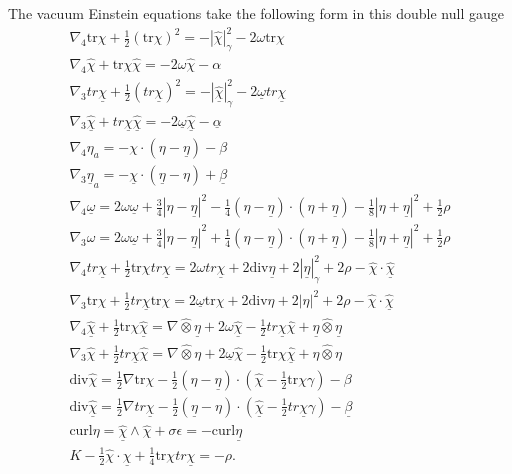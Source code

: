 \documentclass{amsart}
\newcommand{\tr}{\mbox{tr}}
\begin{document}
\noindent The vacuum Einstein equations take the following form in this double null gauge
\begin{gather}
\nabla_{4}\tr\chi+\frac{1}{2}(\tr\chi)^{2}=-|\hat{\chi}|^{2}_{\gamma}-2\omega \tr\chi\\
\nabla_{4}\hat{\chi}+\tr\chi \hat{\chi}=-2\omega\hat{\chi}-\alpha\\
\nabla_{3}tr\underline{\chi}+\frac{1}{2}(tr\underline{\chi})^{2}=-|\hat{\underline{\chi}}|^{2}_{\gamma}-2\underline{\omega}tr\underline{\chi}\\
\nabla_{3}\hat{\underline{\chi}}+tr\underline{\chi}\hat{\underline{\chi}}=-2\underline{\omega}\hat{\underline{\chi}}-\underline{\alpha}\\
\label{eq:eta}
\nabla_{4}\eta_{a}=-\chi\cdot(\eta-\underline{\eta})-\beta\\
\nabla_{3}\underline{\eta}_{a}=-\underline{\chi}\cdot(\underline{\eta}-\eta)+\underline{\beta} \\
\nabla_{4}\underline{\omega}=2\omega\underline{\omega}+\frac{3}{4}|\eta-\underline{\eta}|^{2}-\frac{1}{4}(\eta-\underline{\eta})\cdot(\eta+\underline{\eta})-\frac{1}{8}|\eta+\underline{\eta}|^{2}+\frac{1}{2}\rho \\
\nabla_{3}\omega=2\omega\underline{\omega}+\frac{3}{4}|\eta-\underline{\eta}|^{2}+\frac{1}{4}(\eta-\underline{\eta})\cdot(\eta+\underline{\eta})-\frac{1}{8}|\eta+\underline{\eta}|^{2}+\frac{1}{2}\rho \\
\nabla_{4}tr\underline{\chi}+\frac{1}{2}\tr\chi tr\underline{\chi}=2\omega tr\underline{\chi}+2\text{div}\underline{\eta}+2|\underline{\eta}|^{2}_{\gamma}+2\rho-\hat{\chi}\cdot\hat{\underline{\chi}}\\
\nabla_{3}\tr\chi+\frac{1}{2}tr\underline{\chi}\tr\chi=2\underline{\omega}\tr\chi+2\text{div}\eta+2|\eta|^{2}+2\rho-\hat{\chi}\cdot \hat{\underline{\chi}}\\
\nabla_{4}\hat{\underline{\chi}}+\frac{1}{2}\tr\chi\hat{\underline{\chi}}=\nabla\hat{\otimes}\underline{\eta}+2\omega\hat{\underline{\chi}}-\frac{1}{2}tr\underline{\chi}\hat{\chi}+\underline{\eta}\hat{\otimes}\underline{\eta}\\
\nabla_{3}\hat{\chi}+\frac{1}{2}tr\underline{\chi}\hat{\chi}=\nabla\hat{\otimes}\eta+2\underline{\omega}\hat{\chi}-\frac{1}{2}\tr\chi\hat{\underline{\chi}}+\eta\hat{\otimes}\eta\\
\label{eq:1}
\text{div}\hat{\chi}=\frac{1}{2}\nabla \tr\chi-\frac{1}{2}(\eta-\underline{\eta})\cdot(\hat{\chi}-\frac{1}{2}\tr\chi\gamma)-\beta\\
\text{div}\hat{\underline{\chi}}=\frac{1}{2}\nabla tr\underline{\chi}-\frac{1}{2}(\underline{\eta}-\eta)\cdot(\hat{\underline{\chi}}-\frac{1}{2}tr\underline{\chi}\gamma)-\underline{\beta}\\
\text{curl}\eta=\hat{\underline{\chi}}\wedge\hat{\chi}+\sigma\epsilon=-\text{curl} \underline{\eta}\\
\label{eq:4}
K-\frac{1}{2}\hat{\chi}\cdot \hat{\underline{\chi}}+\frac{1}{4}\tr\chi tr\underline{\chi}=-\rho.
\end{gather}
\end{document}
